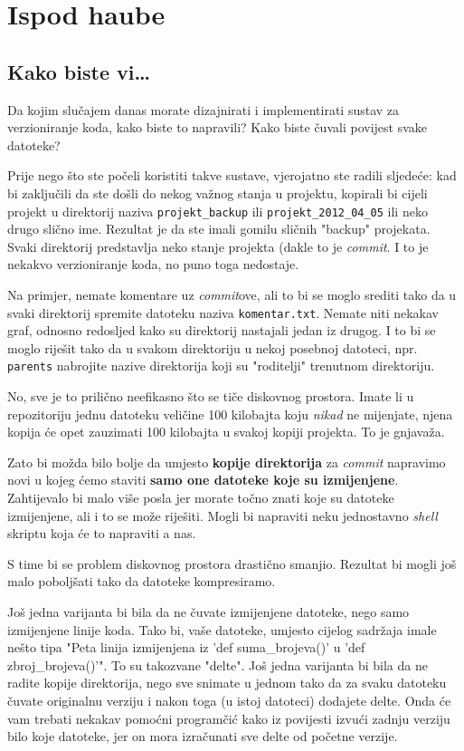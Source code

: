 \chapter*{Ispod haube}

\section*{Kako biste vi\dots}

Da kojim slučajem danas morate dizajnirati i implementirati sustav za verzioniranje koda, kako biste to napravili?
Kako biste čuvali povijest svake datoteke?

Prije nego što ste počeli koristiti takve sustave, vjerojatno ste radili sljedeće: kad bi zaključili da ste došli do nekog važnog stanja u projektu, kopirali bi cijeli projekt u direktorij naziva \verb+projekt_backup+ ili \verb+projekt_2012_04_05+ ili neko drugo slično ime.
Rezultat je da ste imali gomilu sličnih "backup" projekata.
Svaki direktorij predstavlja neko stanje projekta (dakle to je \emph{commit}.
I to je nekakvo verzioniranje koda, no puno toga nedostaje.

Na primjer, nemate komentare uz \emph{commit}ove, ali to bi se moglo srediti tako da u svaki direktorij spremite datoteku naziva \verb+komentar.txt+.
Nemate niti nekakav graf, odnosno redosljed kako su direktorij nastajali jedan iz drugog.
I to bi se moglo riješit tako da u svakom direktoriju u nekoj posebnoj datoteci, npr. \verb+parents+ nabrojite nazive direktorija koji su "roditelji" trenutnom direktoriju.

No, sve je to prilično neefikasno što se tiče diskovnog prostora. 
Imate li u repozitoriju jednu datoteku veličine 100 kilobajta koju \emph{nikad} ne mijenjate, njena kopija će opet zauzimati 100 kilobajta u svakoj kopiji projekta.
To je gnjavaža.

Zato bi možda bilo bolje da umjesto \textbf{kopije direktorija} za \emph{commit} napravimo novi u kojeg ćemo staviti \textbf{samo one datoteke koje su izmijenjene}.
Zahtijevalo bi malo više posla jer morate točno znati koje su datoteke izmijenjene, ali i to se može riješiti.
Mogli bi napraviti neku jednostavno \emph{shell} skriptu koja će to napraviti a nas. 

S time bi se problem diskovnog prostora drastično smanjio. 
Rezultat bi mogli još malo poboljšati tako da datoteke kompresiramo.

Još jedna varijanta bi bila da ne čuvate izmijenjene datoteke, nego samo izmijenjene linije koda.
Tako bi, vaše datoteke, umjesto cijelog sadržaja imale nešto tipa "Peta linija izmijenjena iz 'def suma\_brojeva()' u 'def zbroj\_brojeva()'".
To su takozvane "delte".
Još jedna varijanta bi bila da ne radite kopije direktorija, nego sve snimate u jednom tako da za svaku datoteku čuvate originalnu verziju i nakon toga (u istoj datoteci) dodajete delte.
Onda će vam trebati nekakav pomoćni programčić kako iz povijesti izvući zadnju verziju bilo koje datoteke, jer on mora izračunati sve delte od početne verzije.

